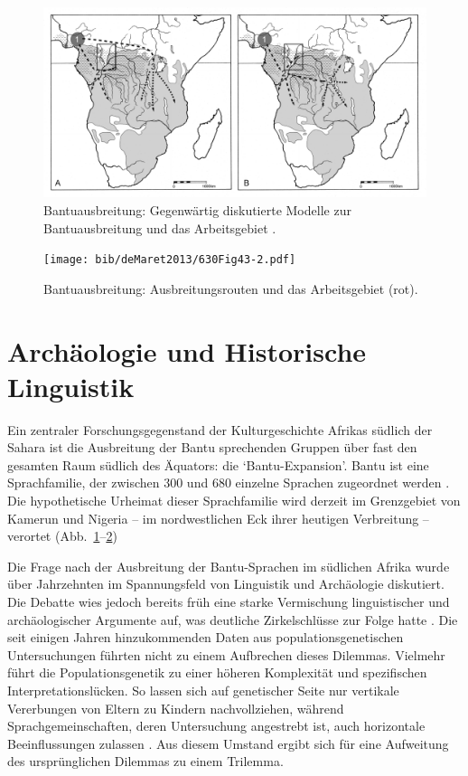 \begin{figure}[p]
	\centering
	\includegraphics[width=\textwidth]{bib/Eggert2012/207Abb6.pdf}
	\caption{Bantuausbreitung: Gegenwärtig diskutierte Modelle zur Bantuausbreitung und das Arbeitsgebiet \parencites[rot; nach][57, Abb.~2]{Pakendorf.2011}[207 Abb.~6a/b]{Eggert.2012}.}
	\label{fig:Bantuexp_Eggert2012-207Abb6ab}
\end{figure}


\begin{figure}[p]
	\centering
	\texttt{[image: bib/deMaret2013/630Fig43-2.pdf]}
	\caption{Bantuausbreitung: Ausbreitungsrouten \parencite[630 Abb. 43.2]{deMaret.2013} und das Arbeitsgebiet (rot).}
	\label{fig:Bantuexp_deMaret2013-630Fig43-2}
\end{figure}

\section{Archäologie und Historische Linguistik}

Ein zentraler Forschungsgegenstand der Kulturgeschichte Afrikas südlich der Sahara ist die Ausbreitung der Bantu sprechenden Gruppen über fast den gesamten Raum südlich des Äquators: die \enquote*{Bantu-Expansion}. Bantu ist eine Sprachfamilie, der zwischen 300 und 680 einzelne Sprachen zugeordnet werden \parencites{Nurse.2003}[81]{Eggert.2016c}. Die hypothetische Urheimat dieser Sprachfamilie wird derzeit im Grenzgebiet von Kamerun und Nigeria -- im nordwestlichen Eck ihrer heutigen Verbreitung -- verortet (Abb.~\ref{fig:Bantuexp_Eggert2012-207Abb6ab}--\ref{fig:Bantuexp_deMaret2013-630Fig43-2})

Die Frage nach der Ausbreitung der Bantu-Sprachen im südlichen Afrika wurde über Jahrzehnten im Spannungsfeld von Linguistik und Archäologie diskutiert. Die Debatte wies jedoch bereits früh eine starke Vermischung linguistischer und archäologischer Argumente auf, was deutliche Zirkelschlüsse zur Folge hatte \parencites{Eggert.2005}[82]{Eggert.2016c}. Die seit einigen Jahren hinzukommenden Daten aus populationsgenetischen Untersuchungen führten nicht zu einem Aufbrechen dieses Dilemmas. Vielmehr führt die Populationsgenetik zu einer höheren Komplexität und spezifischen Interpretationslücken. So lassen sich auf genetischer Seite nur vertikale Vererbungen von Eltern zu Kindern nachvollziehen, während Sprachgemeinschaften, deren Untersuchung angestrebt ist, auch horizontale Beeinflussungen zulassen \parencite[86]{Eggert.2016c}. Aus diesem Umstand ergibt sich für \textcite{Eggert.2016c} eine Aufweitung des ursprünglichen Dilemmas zu einem Trilemma.

